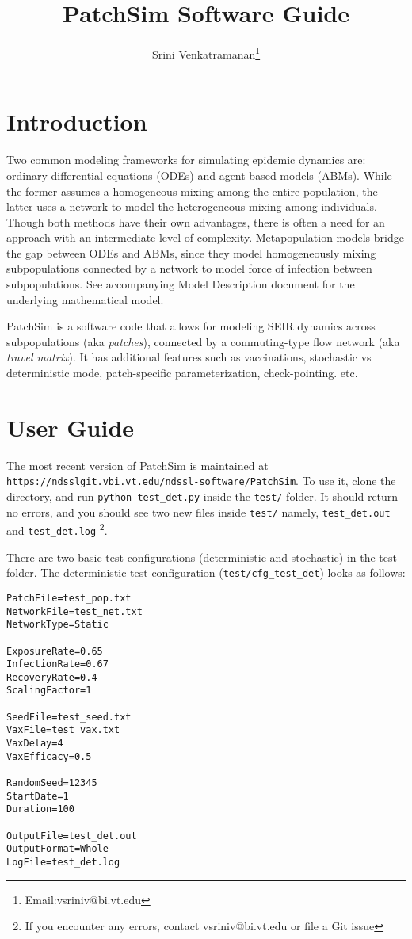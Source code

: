 \documentclass[10pt]{scrartcl}
\title{PatchSim Software Guide}
\author{Srini Venkatramanan\footnote{Email:vsriniv@bi.vt.edu}}
\theoremstyle{definition}
\begin{document}
\maketitle

\section{Introduction}
Two common modeling frameworks for simulating epidemic dynamics are: ordinary 
differential equations (ODEs) and agent-based models (ABMs). While the former 
assumes a homogeneous mixing among the entire population, the latter uses a 
network to model the heterogeneous mixing among individuals. Though both 
methods have their own advantages, there is often a need for an approach with 
an intermediate level of complexity. Metapopulation models bridge the gap 
between ODEs and ABMs, since they model 
homogeneously mixing subpopulations connected by a network to model force of 
infection between subpopulations. See accompanying Model Description document 
for the underlying mathematical model.

PatchSim is a software code that allows for 
modeling SEIR dynamics across subpopulations (aka \emph{patches}), connected by 
a commuting-type flow network (aka \emph{travel matrix}). It has additional 
features such as vaccinations, stochastic vs deterministic mode, patch-specific 
parameterization, check-pointing. etc.

\section{User Guide}
\label{sec:user-guide}
The most recent version of PatchSim is maintained at 
\verb|https://ndsslgit.vbi.vt.edu/ndssl-software/PatchSim|. To use it, clone 
the directory, and run \verb|python test_det.py| inside the \verb|test/| 
folder. It should return no errors, and you should see two new files inside 
\verb|test/| namely, \verb|test_det.out| and \verb|test_det.log| \footnote{If 
you encounter any errors, contact vsriniv@bi.vt.edu or file a Git issue}.

There are two basic test configurations (deterministic and stochastic) in the 
test folder. The deterministic test configuration (\verb|test/cfg_test_det|) 
looks as follows:
\begin{small}
\begin{center}
\begin{lstlisting}
PatchFile=test_pop.txt
NetworkFile=test_net.txt
NetworkType=Static

ExposureRate=0.65
InfectionRate=0.67
RecoveryRate=0.4
ScalingFactor=1

SeedFile=test_seed.txt
VaxFile=test_vax.txt
VaxDelay=4
VaxEfficacy=0.5

RandomSeed=12345
StartDate=1
Duration=100

OutputFile=test_det.out
OutputFormat=Whole
LogFile=test_det.log
\end{lstlisting}
\end{center}
\end{small}
\end{document}
